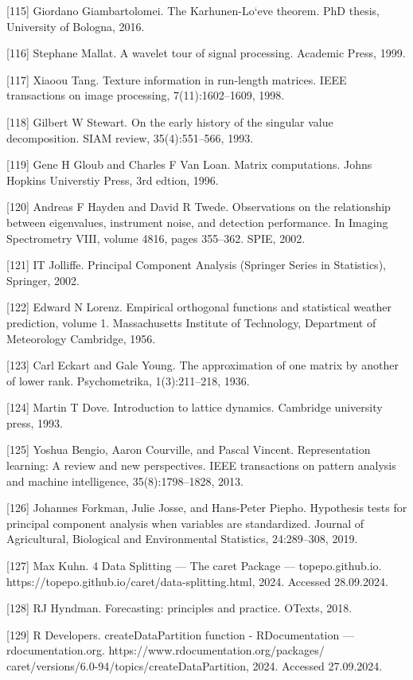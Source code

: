 \documentclass[preprint,12pt]{elsarticle}
\begin{document}
[115] Giordano Giambartolomei. The Karhunen-Lo`eve theorem. PhD thesis, University of Bologna, 2016. 

[116] Stephane Mallat. A wavelet tour of signal processing. Academic Press, 1999. 

[117] Xiaoou Tang. Texture information in run-length matrices. IEEE transactions on image processing, 7(11):1602–1609, 1998. 

[118] Gilbert W Stewart. On the early history of the singular value decomposition. SIAM review, 35(4):551–566, 1993. 

[119] Gene H Gloub and Charles F Van Loan. Matrix computations. Johns Hopkins Universtiy Press, 3rd edtion, 1996. 

[120] Andreas F Hayden and David R Twede. Observations on the relationship between eigenvalues, instrument noise, and detection performance. In Imaging Spectrometry VIII, volume 4816, pages 355–362. SPIE, 2002. 

[121] IT Jolliffe. Principal Component Analysis (Springer Series in Statistics), Springer, 2002. 

[122] Edward N Lorenz. Empirical orthogonal functions and statistical weather prediction, volume 1. Massachusetts Institute of Technology, Department of Meteorology Cambridge, 1956. 

[123] Carl Eckart and Gale Young. The approximation of one matrix by another of lower rank. Psychometrika, 1(3):211–218, 1936. 

[124] Martin T Dove. Introduction to lattice dynamics. Cambridge university press, 1993. 

[125] Yoshua Bengio, Aaron Courville, and Pascal Vincent. Representation learning: A review and new perspectives. IEEE transactions on pattern analysis and machine intelligence, 35(8):1798–1828, 2013. 

[126] Johannes Forkman, Julie Josse, and Hans-Peter Piepho. Hypothesis tests for principal component analysis when variables are standardized. Journal of Agricultural, Biological and Environmental Statistics, 24:289–308, 2019. 

[127] Max Kuhn. 4 Data Splitting — The caret Package — topepo.github.io. https://topepo.github.io/caret/data-splitting.html, 2024. Accessed 28.09.2024. 

[128] RJ Hyndman. Forecasting: principles and practice. OTexts, 2018. 

[129] R Developers. createDataPartition function - RDocumentation — rdocumentation.org. https://www.rdocumentation.org/packages/ caret/versions/6.0-94/topics/createDataPartition, 2024. Accessed 27.09.2024. 
\end{document}
